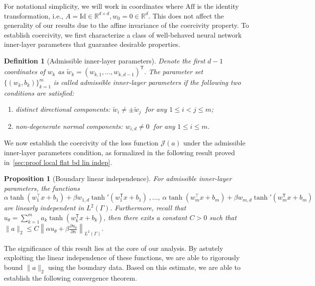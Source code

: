 \documentclass{article}
\newtheorem{proposition}{Proposition}
\newtheorem{definition}{Definition}
\newcommand{\T}{\mathsf{T}}
\begin{document}
For notational simplicity, we will work in coordinates where $\mathrm{Aff}$ is the identity transformation, i.e., $ A = \mathrm{Id}\in \mathbb{R}^{d\times d}, w_{0} = 0\in\mathbb{R}^{d}$. 
This does not affect the generality of our results due to the affine invariance of the coercivity property.
To establish coercivity, we first characterize a class of well-behaved neural network inner-layer parameters that guarantee desirable properties.
\begin{definition}[Admissible inner-layer parameters]\label{def:admissible}
    Denote the first \(d-1\) coordinates of \(w_k\) as \(\tilde{w}_k = (w_{k,1}, \ldots, w_{k,d-1})^\T\).
    The parameter set $\{(w_k,b_k)\}_{k=1}^{m}$ is called admissible inner-layer parameters if the following two conditions are satisfied:
    \begin{enumerate}
        \item[(i)] distinct directional components: $\tilde{w}_{i}\neq \pm \tilde{w}_{j}\ $ for any $1\le i<j\le m$;
        \item[(ii)] non-degenerate normal components: $w_{i,d}\neq 0\ $ for any $1\le i\le  m$.
    \end{enumerate}
\end{definition}

We now establish the coercivity of the loss function $\mathcal{J}(a)$ under the admissible inner-layer parameters condition, as formalized in the following result proved in~\cref{sec:proof local flat bd lin indep}.
\begin{proposition}[Boundary linear independence]\label{proposition:local flat bd lin indep}
    For admissible inner-layer parameters, the functions 
    \begin{equation*}
       \alpha \tanh(w_1^\top x + b_1)+\beta w_{1,d} \tanh'(w_1^\T x+b_1) \ ,\ldots,\ \alpha \tanh(w_m^\top x + b_m)+\beta w_{m,d} \tanh'(w_m^\T x+b_m)
    \end{equation*}
    are linearly independent in $L^{2}(\Gamma)$. 
    Furthermore, recall that $u_{\theta}=\sum_{k=1}^{m}a_k \tanh(w_k ^\T x+ b_k)$, then there exits a constant $C>0$ such that
    $
           \|a\|_{2} \leq C \left\|\alpha u_{\theta}+\beta \frac{\partial u_{\theta}}{\partial n}\right\|_{L^{2}(\Gamma)} .
    $
\end{proposition}
The significance of this result lies at the core of our analysis. 
By astutely exploiting the linear independence of these functions, we are able to rigorously bound $\|a\|_2$ using the boundary data. 
Based on this estimate, we are able to establish the following convergence theorem.
\end{document}
